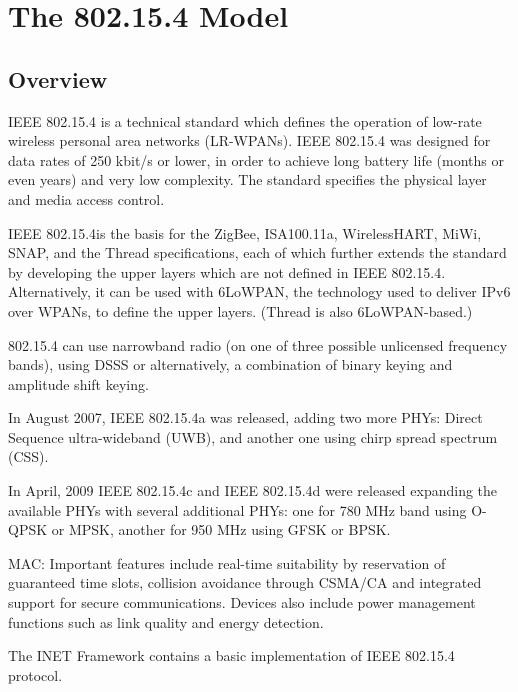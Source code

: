 \ifdraft

\chapter{The 802.15.4 Model}
\label{cha:802154}

\section{Overview}

IEEE 802.15.4 is a technical standard which defines the operation of low-rate
wireless personal area networks (LR-WPANs). IEEE 802.15.4 was designed for data
rates of 250 kbit/s or lower, in order to achieve long battery life (months or
even years) and very low complexity. The standard specifies the physical layer
and media access control.

IEEE 802.15.4is the basis for the ZigBee, ISA100.11a, WirelessHART, MiWi, SNAP,
and the Thread specifications, each of which further extends the standard by
developing the upper layers which are not defined in IEEE 802.15.4.
Alternatively, it can be used with 6LoWPAN, the technology used to deliver IPv6
over WPANs, to define the upper layers. (Thread is also 6LoWPAN-based.)


\begin{note}

802.15.4 can use narrowband radio (on one of three possible unlicensed frequency
bands), using DSSS or alternatively, a combination of binary keying and amplitude 
shift keying.

In August 2007, IEEE 802.15.4a was released, adding two more PHYs: Direct
Sequence ultra-wideband (UWB), and another one using chirp spread spectrum
(CSS).

In April, 2009 IEEE 802.15.4c and IEEE 802.15.4d were released expanding the
available PHYs with several additional PHYs: one for 780 MHz band using O-QPSK
or MPSK, another for 950 MHz using GFSK or BPSK.


MAC: Important features include real-time suitability by reservation of
guaranteed time slots, collision avoidance through CSMA/CA and integrated
support for secure communications. Devices also include power management
functions such as link quality and energy detection.

\end{note}

The INET Framework contains a basic implementation of IEEE 802.15.4 protocol.

